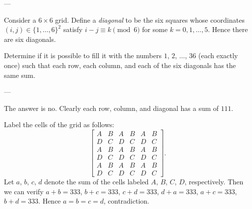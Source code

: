 
---

Consider a $6\times6$ grid. Define a \emph{diagonal} to be the six squares whose coordinates $(i,j)\in\{1,\ldots,6\}^2$ satisfy $i-j\equiv k\pmod6$ for some $k=0,1,\ldots,5$. Hence there are six diagonals.

Determine if it is possible to fill it with the numbers $1$, $2$, $\ldots$, $36$ (each exactly once) such that each row, each column, and each of the six diagonals has the same sum.

---

The answer is no. Clearly each row, column, and diagonal has a sum of $111$.

Label the cells of the grid as follows: \[\begin{bmatrix}
    A&B&A&B&A&B\\
    D&C&D&C&D&C\\
    A&B&A&B&A&B\\
    D&C&D&C&D&C\\
    A&B&A&B&A&B\\
    D&C&D&C&D&C
\end{bmatrix}.\]
Let $a$, $b$, $c$, $d$ denote the sum of the cells labeled $A$, $B$, $C$, $D$, respectively. Then we can verify $a+b=333$, $b+c=333$, $c+d=333$, $d+a=333$, $a+c=333$, $b+d=333$. Hence $a=b=c=d$, contradiction.

